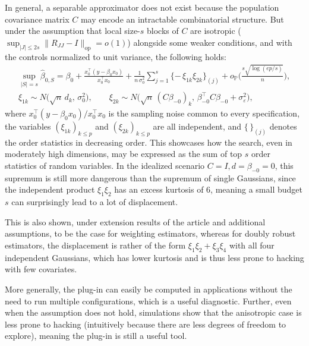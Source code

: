 In general, a separable approximator does not exist because the population covariance matrix $C$ may encode an intractable combinatorial structure. But under the assumption that local size-$s$ blocks of $C$ are isotropic ($\sup_{|J|\le 2s}\|R_{JJ}-I\|_{\mathrm{op}}=o(1)$) alongside some weaker conditions, and with the controls normalized to
unit variance, the following holds:
\begin{equation}\label{eq:plugin-general}
\begin{gathered}
        \sup_{|S|=s} \hat\beta_{0,S}
        =\beta_0
        + \frac{x_0^\top (y - \beta_0 x_0)}{x_0^\top x_0}
        + \frac{1}{n\,\sigma_0^2}\sum_{j=1}^{s}\{-\,\xi_{1k}\xi_{2k}\}_{(j)}
        +o_{\mathbb P}\!\Big(\tfrac{s\sqrt{\log(ep/s)}}{n}\Big),
        \\
        \xi_{1k} \sim N\big(\sqrt n\, d_k,\,\sigma_0^2\big),
        \qquad
        \xi_{2k} \sim N\big(\sqrt n\,(C\beta_{-0})_k,\,\beta_{-0}^\top C\beta_{-0}+\sigma_\varepsilon^2\big),
\end{gathered}
\end{equation}
where $x_0^\top (y - \beta_0 x_0) / x_0^\top x_0$ is the
sampling noise common to every specification, the variables
$(\xi_{1k})_{k \le p}$ and $(\xi_{2k})_{k \le p}$ are all independent, and
$\{\,\}_{(j)}$ denotes the order statistics in decreasing order. This showcases how the search, even in moderately high dimensions, may be expressed as the sum of top $s$ order statistics of random variables. In the idealized scenario $C  = I, d = \beta_{-0} = 0$, this supremum is still more dangerous than the supremum of single Gaussians, since the independent product $\xi_{1}\xi_{2}$ has an excess kurtosis of 6, meaning a small budget $s$ can surprisingly lead to a lot of displacement. 

This is also shown, under extension results of the article and additional assumptions, to be the case for weighting estimators, whereas for doubly robust estimators, the displacement is rather of the form $\xi_{1}\xi_{2} + \xi_{3}\xi_{4}$ with all four independent Gaussians, which has lower kurtosis and is thus less prone to hacking with few covariates. 

More generally, the plug-in can easily be computed in applications without the need to run multiple configurations, which is a useful diagnostic. Further, even when the assumption does not hold, simulations show that the anisotropic case is less prone to hacking (intuitively because there are less degrees of freedom to explore), meaning the plug-in is still a useful tool. 

